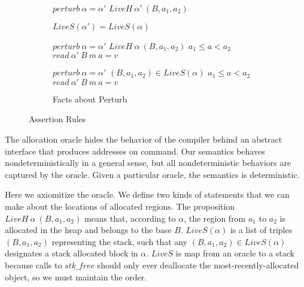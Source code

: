 \documentclass{article}
\begin{document}
\begin{figure}
\begin{subfigure}{\textwidth}
    \begin{minipage}{0.5\textwidth}
                 {\(\mathit{perturb} ~ \alpha = \alpha'\)}
                 {\(LiveH ~ \alpha' ~ (B,a_1,a_2)\)}
    \end{minipage}
    \begin{minipage}{0.5\textwidth}
             {\(LiveS(\alpha') = LiveS(\alpha)\)}
    \end{minipage}
                  {\(\mathit{perturb} ~ \alpha = \alpha'\)}
                  {\(LiveH ~ \alpha ~ (B,a_1,a_2)\)}
                  {\(a_1 \leq a < a_2\)}
                  {\(\mathit{read} ~ \alpha' ~ B ~ m ~ a = v\)}

                  {\(\mathit{perturb} ~ \alpha = \alpha'\)}
                  {\((B,a_1,a_2) \in LiveS(\alpha)\)}
                  {\(a_1 \leq a < a_2\)}
                  {\(\mathit{read} ~ \alpha' ~ B ~ m ~ a = v\)}
                 
    \caption{Facts about Perturb}
  \end{subfigure}
  
  \caption{Assertion Rules}
  \label{fig:asserts}
\end{figure}

The allocation oracle hides the behavior of the compiler behind an abstract
interface that produces addresses on command. Our semantics behaves
nondeterministically in a general sense, but all nondeterministic behaviors are
captured by the oracle. Given a particular oracle, the semantics is deterministic.

Here we axiomitize the oracle. We define two kinds of statements that we can make
about the locations of allocated regions. The proposition
\(\mathit{LiveH} ~ \alpha ~ (B, a_1, a_2)\) means that, according to \(\alpha\), the
region from \(a_1\) to \(a_2\) is allocated in the heap and belongs to the base
\(B\). \(\mathit{LiveS}(\alpha)\) is a list of triples \((B, a_1, a_2)\) representing
the stack, such that any \((B, a_1, a_2) \in \mathit{LiveS}(\alpha)\) designates
a stack allocated block in \(\alpha\). \(\mathit{LiveS}\) is map from an oracle
to a stack because calls to \(\mathit{stk\_free}\) should only ever deallocate
the most-recently-allocated object, so we must maintain the order.
\end{document}
